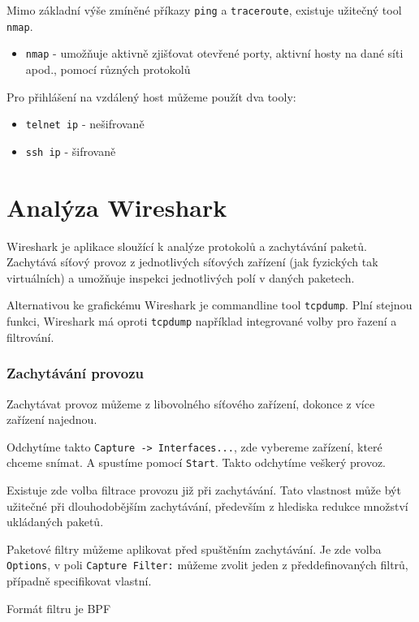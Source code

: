 Mimo základní výše zmíněné příkazy \texttt{ping} a \texttt{traceroute},
existuje užitečný tool \texttt{nmap}.

\begin{itemize}
				\item \texttt{nmap} - umožňuje aktivně zjišťovat otevřené porty, aktivní hosty na dané síti apod., pomocí různých protokolů
\end{itemize}


Pro přihlášení na vzdálený host můžeme použít dva tooly:
\begin{itemize}
				\item \texttt{telnet ip} - nešifrovaně
				\item \texttt{ssh ip} - šifrovaně
\end{itemize}



\section{Analýza Wireshark}
Wireshark je aplikace sloužící k analýze protokolů a zachytávání paketů. Zachytává síťový provoz z jednotlivých síťových zařízení (jak fyzických tak virtuálních) a umožňuje inspekci jednotlivých polí v daných paketech.

Alternativou ke grafickému Wireshark je commandline tool \texttt{tcpdump}. Plní stejnou funkci, Wireshark má oproti \texttt{tcpdump} například integrované volby pro řazení a filtrování.


\subsubsection{Zachytávání provozu}
Zachytávat provoz můžeme z libovolného síťového zařízení, dokonce z více zařízení najednou.

Odchytíme takto \texttt{Capture -> Interfaces...}, zde vybereme zařízení, které chceme snímat. A spustíme pomocí \texttt{Start}. Takto odchytíme veškerý provoz.

Existuje zde volba filtrace provozu již při zachytávání. Tato vlastnost může být užitečné při dlouhodobějším zachytávání, především z hlediska redukce množství ukládaných paketů.

Paketové filtry můžeme aplikovat před spuštěním zachytávání. Je zde volba \texttt{Options}, v poli \texttt{Capture Filter:} můžeme zvolit jeden z předdefinovaných filtrů, případně specifikovat vlastní.

Formát filtru je BPF

